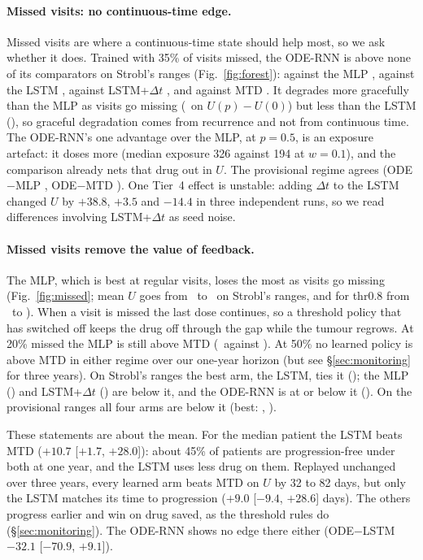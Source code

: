 \documentclass[10pt]{article}
\begin{document}
\paragraph{Missed visits: no continuous-time edge.} Missed visits are where a
continuous-time state should help most, so we ask whether it does. Trained with
35\% of visits missed, the ODE-RNN is above none of its comparators on Strobl's ranges
(Fig.~\ref{fig:forest}): against the MLP \SBOdeMlp, against the LSTM
\SBOdeLstm, against LSTM+$\Delta t$ \SBOdeLstmDt, and against MTD \SBOdeMtd. It
degrades more gracefully than the MLP as visits go missing (\SBGraceMlp\ on
$U(p)-U(0)$) but less than the LSTM (\SBGraceLstm), so graceful degradation
comes from recurrence and not from continuous time. The ODE-RNN's one advantage
over the MLP, at $p=0.5$, is an exposure artefact: it doses more (median
exposure 326 against 194 at $w=0.1$), and the comparison already nets that drug
out in $U$.
The provisional regime agrees (ODE$-$MLP \WBOdeMlp, ODE$-$MTD \WBOdeMtd). One
Tier~4 effect is unstable: adding $\Delta t$ to the LSTM changed $U$ by $+38.8$,
$+3.5$ and $-14.4$ in three independent runs, so we read differences involving
LSTM+$\Delta t$ as seed noise.

\paragraph{Missed visits remove the value of feedback.} The MLP, which is best at
regular visits, loses the most as visits go missing (Fig.~\ref{fig:missed};
mean $U$ goes from \SBUMlpZero\ to \SBUMlpHalf\ on Strobl's ranges, and for
thr0.8 from \SBUThrZero\ to \SBUThrHalf). When a visit is missed the last dose
continues, so a threshold policy that has switched off keeps the drug off
through the gap while the tumour regrows. At 20\% missed the MLP is still above
MTD (\SBUMlpFifth\ against \SBUMtdFifth). At 50\% no learned policy is above MTD
in either regime over our one-year horizon (but see \S\ref{sec:monitoring} for
three years). On Strobl's ranges the best arm, the LSTM, ties it (\SBFb); the
MLP (\SBFbMlp) and LSTM+$\Delta t$ (\SBFbLstmDt) are below it, and the ODE-RNN is
at or below it (\SBFbOde). On the provisional ranges all four arms are below it
(best: \WBFbBest, \WBFb).

These statements are about the mean. For the median patient the LSTM beats MTD
($+10.7$ [$+1.7$, $+28.0$]): about 45\% of patients are progression-free under
both at one year, and the LSTM uses less drug on them. Replayed unchanged over
three years, every learned arm beats MTD on $U$ by 32 to 82 days, but only the
LSTM matches its time to progression ($+9.0$ [$-9.4$, $+28.6$] days). The others
progress earlier and win on drug saved, as the threshold rules do
(\S\ref{sec:monitoring}). The ODE-RNN shows no edge there either (ODE$-$LSTM
$-32.1$ [$-70.9$, $+9.1$]).
\end{document}
